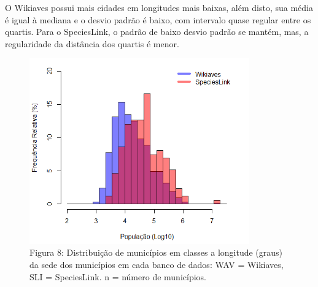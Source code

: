 \begin{resposta}
O Wikiaves possui mais cidades em longitudes mais baixas, além disto, sua média é igual à mediana e o desvio padrão é baixo, com intervalo quase regular entre os quartis. Para o SpeciesLink, o padrão de baixo desvio padrão se mantém, mas, a regularidade da distância dos quartis é menor.
\end{resposta}


\begin{figure}[h!]
\centering
\includegraphics[height = 8cm]{Imagens/H06.png}
\\{\scriptsize Figura 8: Distribuição de municípios em classes a longitude (graus) da sede dos municípios em cada banco de dados: WAV = Wikiaves, SLI = SpeciesLink. n = número de municípios.}
\end{figure}

\newpage